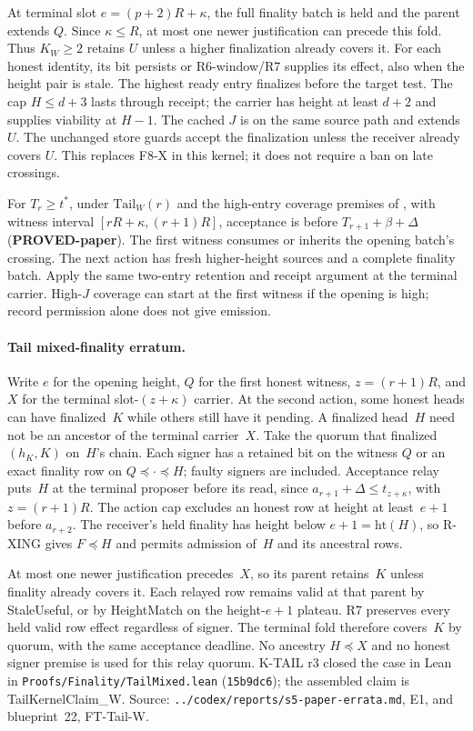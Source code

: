 \documentclass{article}
\theoremstyle{plain}
\theoremstyle{definition}
\theoremstyle{remark}
\begin{document}
At terminal slot $e=(p+2)R+\kappa$, the full finality batch is held
and the parent extends $Q$.  Since $\kappa\leq R$, at most one newer
justification can precede this fold.  Thus $K_W\geq2$ retains $U$ unless
a higher finalization already covers it.  For each honest identity,
its bit persists or R6-window/R7 supplies its effect, also when the height
pair is stale.  The highest ready entry finalizes before the target test.
The cap $H\leq d+3$ lasts through receipt; the carrier has height at
least $d+2$ and supplies viability at $H-1$.  The cached $J$ is on the
same source path and extends $U$.  The unchanged store guards accept
the finalization unless the receiver already covers $U$.
This replaces F8-X in this kernel; it does not require a ban on late crossings.

For $T_r\geq t^*$, under $\mathrm{Tail}_W(r)$ and the high-entry coverage premises of
, with witness interval $[rR+\kappa,(r+1)R]$, acceptance
is before $T_{r+1}+\beta+\Delta$ (\textbf{PROVED-paper}).
The first witness consumes or inherits the opening batch's crossing.
The next action has fresh higher-height sources and a complete finality
batch.  Apply the same two-entry retention and receipt argument at the
terminal carrier.  High-$J$ coverage can start at the first witness if
the opening is high; record permission alone does not give emission.

\paragraph{Tail mixed-finality erratum.}\label{par:tail-mixed}
Write $e$ for the opening height, $Q$ for the first honest witness,
$z=(r+1)R$, and $X$ for the terminal slot-$(z+\kappa)$ carrier.
At the second action, some honest heads can have finalized~$K$ while
others still have it pending.  A finalized head~$H$ need not be an
ancestor of the terminal carrier~$X$.  Take the quorum that finalized
$(h_K,K)$ on~$H$'s chain.  Each signer has a retained bit on the witness
$Q$ or an exact finality row on $Q\preceq\cdot\preceq H$; faulty
signers are included.  Acceptance relay puts~$H$ at the terminal
proposer before its read, since
$a_{r+1}+\Delta\leq t_{z+\kappa}$, with $z=(r+1)R$.
The action cap excludes an honest row at height at least~$e+1$ before
$a_{r+2}$.  The receiver's held finality has height below
$e+1=\mathrm{ht}(H)$, so R-XING gives $F\preceq H$ and permits
admission of~$H$ and its ancestral rows.

At most one newer justification precedes~$X$, so its parent retains~$K$
unless finality already covers it.  Each relayed row remains valid at
that parent by StaleUseful, or by HeightMatch on the height-$e+1$
plateau.  R7 preserves every held valid row effect regardless of
signer.  The terminal fold therefore covers~$K$ by quorum, with the
same acceptance deadline.  No ancestry $H\preceq X$ and no honest
signer premise is used for this relay quorum.  K-TAIL r3 closed the
case in Lean in \texttt{Proofs/Finality/TailMixed.lean}
(\texttt{15b9dc6}); the assembled claim is
\textsf{TailKernelClaim\_W}.  Source:
\nolinkurl{../codex/reports/s5-paper-errata.md}, E1, and blueprint~22,
FT-Tail-W.
\end{document}
